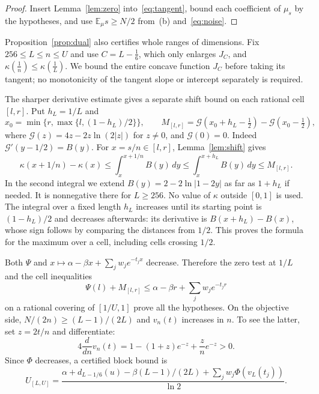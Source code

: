 \documentclass[11pt]{amsart}
\theoremstyle{definition}
\theoremstyle{remark}
\newcommand{\E}{\mathbb E}
\begin{document}
\begin{proof}
Insert Lemma~\ref{lem:zero} into~\eqref{eq:tangent}, bound each coefficient of $\mu_s$ by the hypotheses, and use $\E_\mu s\ge N/2$ from~(b) and~\eqref{eq:noise}.
\end{proof}

Proposition~\ref{prop:dual} also certifies whole ranges of dimensions. Fix $256\le L\le n\le U$ and use $C=L-\frac16$, which only enlarges $J_C$, and $\kappa(\frac1n)\le\kappa(\frac1L)$. We bound the entire concave function $J_C$ before taking its tangent; no monotonicity of the tangent slope or intercept separately is required.

The sharper derivative estimate gives a separate shift bound on each rational cell $[l,r]$. Put $h_L=1/L$ and
\[
 x_0=\min\{r,\max\{l,(1-h_L)/2\}\},\qquad
 M_{[l,r]}=\mathcal G(x_0+h_L-\tfrac12)-\mathcal G(x_0-\tfrac12),
\]
where $\mathcal G(z)=4z-2z\ln(2|z|)$ for $z\ne0$, and $\mathcal G(0)=0$. Indeed $\mathcal G'(y-1/2)=B(y)$. For $x=s/n\in[l,r]$, Lemma~\ref{lem:shift} gives
\[
 \kappa(x+1/n)-\kappa(x)\le\int_x^{x+1/n}B(y)\,dy
 \le\int_x^{x+h_L}B(y)\,dy\le M_{[l,r]}.
\]
In the second integral we extend $B(y)=2-2\ln|1-2y|$ as far as $1+h_L$ if needed. It is nonnegative there for $L\ge256$. No value of $\kappa$ outside $[0,1]$ is used. The integral over a fixed length $h_L$ increases until its starting point is $(1-h_L)/2$ and decreases afterwards: its derivative is $B(x+h_L)-B(x)$, whose sign follows by comparing the distances from $1/2$. This proves the formula for the maximum over a cell, including cells crossing $1/2$.

Both $\Psi$ and $x\mapsto\alpha-\beta x+\sum_jw_je^{-t_jx}$ decrease. Therefore the zero test at $1/L$ and the cell inequalities
\begin{equation}\label{eq:cell}
 \Psi(l)+M_{[l,r]}\le\alpha-\beta r+\sum_jw_je^{-t_jr}
\end{equation}
on a rational covering of $[1/U,1]$ prove all the hypotheses. On the objective side, $N/(2n)\ge(L-1)/(2L)$ and $v_n(t)$ increases in $n$. To see the latter, set $z=2t/n$ and differentiate:
\[
 4\frac{d}{dn}v_n(t)=1-(1+z)e^{-z}+\frac zn e^{-z}>0.
\]
Since $\Phi$ decreases, a certified block bound is
\begin{equation}\label{eq:blockobjective}
 U_{[L,U]}=\frac{\alpha+d_{L-1/6}(u)-\beta(L-1)/(2L)+\sum_jw_j\Phi(v_L(t_j))}{\ln2}.
\end{equation}
\end{document}
